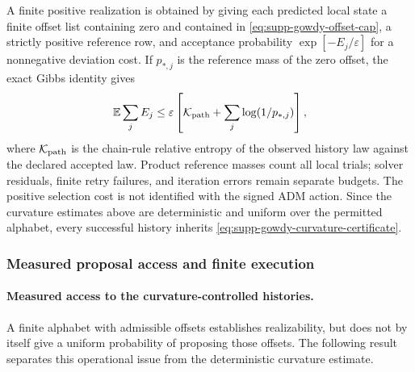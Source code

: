 \documentclass[11pt]{article}
\numberwithin{equation}{section}
\theoremstyle{definition}
\theoremstyle{remark}
\begin{document}
A finite positive realization is obtained by giving each predicted local state
a finite offset list containing zero and contained in
\eqref{eq:supp-gowdy-offset-cap}, a strictly positive reference row, and
acceptance probability $\exp[-E_j/\varepsilon]$ for a nonnegative deviation
cost.  If $p_{*,j}$ is the reference mass of the zero offset, the exact Gibbs
identity gives
\begin{equation}
 \mathbb E\sum_jE_j
 \le\varepsilon\left[
 \mathcal K_{\rm path}+\sum_j\log(1/p_{*,j})\right],
 \label{eq:supp-gowdy-gibbs-bound}
\end{equation}
where $\mathcal K_{\rm path}$ is the chain-rule relative entropy of the observed
history law against the declared accepted law.  Product reference masses count
all local trials; solver residuals, finite retry failures, and iteration errors
remain separate budgets.  The positive selection cost is not identified with
the signed ADM action.  Since the curvature estimates above are deterministic
and uniform over the permitted alphabet, every successful history inherits
\eqref{eq:supp-gowdy-curvature-certificate}.

\subsubsection{Measured proposal access and finite execution}

\paragraph{Measured access to the curvature-controlled histories.}
A finite alphabet with admissible offsets establishes realizability, but does
not by itself give a uniform probability of proposing those offsets.  The
following result separates this operational issue from the deterministic
curvature estimate.
\end{document}
